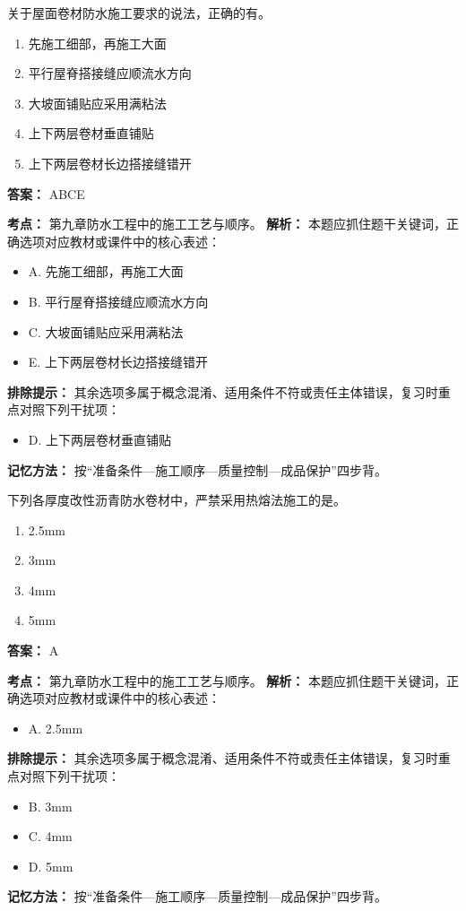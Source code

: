 \documentclass[UTF8,fontset=fandol,11pt]{ctexart}
\begin{document}
\begin{quizbox}[title={第 4 题}]
关于屋面卷材防水施工要求的说法，正确的有。\\
\begin{enumerate}[label=\Alph*.]
\item 先施工细部，再施工大面
\item 平行屋脊搭接缝应顺流水方向
\item 大坡面铺贴应采用满粘法
\item 上下两层卷材垂直铺贴
\item 上下两层卷材长边搭接缝错开
\end{enumerate}
\textbf{答案：} ABCE
\vspace{0.25em}
\begin{answerbox}[title={考点解析}]
\textbf{考点：} 第九章防水工程中的施工工艺与顺序。
\textbf{解析：} 本题应抓住题干关键词，正确选项对应教材或课件中的核心表述：
\begin{itemize}
\item A. 先施工细部，再施工大面
\item B. 平行屋脊搭接缝应顺流水方向
\item C. 大坡面铺贴应采用满粘法
\item E. 上下两层卷材长边搭接缝错开
\end{itemize}
\textbf{排除提示：} 其余选项多属于概念混淆、适用条件不符或责任主体错误，复习时重点对照下列干扰项：
\begin{itemize}
\item D. 上下两层卷材垂直铺贴
\end{itemize}
\textbf{记忆方法：} 按“准备条件—施工顺序—质量控制—成品保护”四步背。
\end{answerbox}
\end{quizbox}

\begin{quizbox}[title={第 5 题}]
下列各厚度改性沥青防水卷材中，严禁采用热熔法施工的是。\\
\begin{enumerate}[label=\Alph*.]
\item 2.5mm
\item 3mm
\item 4mm
\item 5mm
\end{enumerate}
\textbf{答案：} A
\vspace{0.25em}
\begin{answerbox}[title={考点解析}]
\textbf{考点：} 第九章防水工程中的施工工艺与顺序。
\textbf{解析：} 本题应抓住题干关键词，正确选项对应教材或课件中的核心表述：
\begin{itemize}
\item A. 2.5mm
\end{itemize}
\textbf{排除提示：} 其余选项多属于概念混淆、适用条件不符或责任主体错误，复习时重点对照下列干扰项：
\begin{itemize}
\item B. 3mm
\item C. 4mm
\item D. 5mm
\end{itemize}
\textbf{记忆方法：} 按“准备条件—施工顺序—质量控制—成品保护”四步背。
\end{answerbox}
\end{quizbox}
\end{document}
